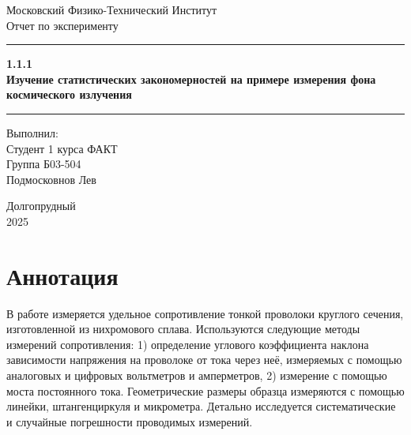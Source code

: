 \documentclass[a4paper, 12pt]{article}
\begin{document}
\begin{titlepage}
    
    \begin{center}
        \vspace*{5cm}
        \Huge Московский Физико-Технический Институт
        \vspace*{2cm}\\
        \LARGE Отчет по эксперименту
        \\\vspace*{0.25cm}
        
        \noindent\rule{\textwidth}{1pt}
        \vspace*{-0.25cm}
        
        \huge \textbf{1.1.1\\ Изучение статистических закономерностей на примере измерения фона космического излучения}
        \noindent\rule{\textwidth}{1pt}


       \vfill
        \begin{flushright}
            \begin{minipage}{.4\textwidth}
            \Large Выполнил:\\ Студент 1 курса ФАКТ\\ Группа Б03-504 \\Подмосковнов Лев\\
            \end{minipage}
        \end{flushright}
        
        \vfill
        \normalsize Долгопрудный \\2025
        
    \end{center}
\end{titlepage}
\restoregeometry

\setcounter{page}{2}
\section*{Аннотация}

В работе измеряется удельное сопротивление тонкой проволоки круглого сечения, изготовленной из нихромового сплава. Используются следующие методы измерений сопротивления: 1) определение углового коэффициента наклона зависимости напряжения на проволоке от тока через неё, измеряемых с помощью аналоговых и цифровых вольтметров и амперметров, 2) измерение с помощью моста постоянного тока. Геометрические размеры образца измеряются с помощью линейки, штангенциркуля и микрометра. Детально исследуется систематические и случайные погрешности проводимых измерений.
\end{document}
